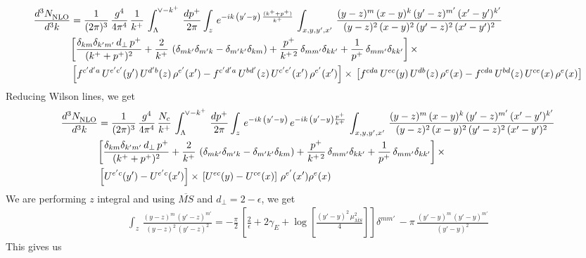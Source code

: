 \begin{align}
     \frac{d^{3}N_{\rm NLO}^{\rm}}{d^{3}k}  & = \frac{1}{(2\pi)^{3}}\,\frac{g^{4}}{4\pi^{4}}\,\frac{1}{k^{+}}\,\int_{\Lambda}^{\vee-k^{+}}\, \frac{dp^{+}}{2\pi}\int_{z}\,e^{-ik\,\left(y'-y\right)\, \frac{(k^{+}+p^{+})}{k^{+}}}\,\int_{x,y,y^{\prime},x'}\,\frac{(y-z)^{m}\,(x-y)^{k}\,(y'-z)^{m'}\,(x'-y')^{k'}}{(y-z)^{2}\,(x-y)^{2}\,(y'-z)^{2}\,(x'-y')^{2}}\notag \\ &  \bigg[\frac{\delta_{km}\delta_{k'm'}\,d_{\perp}\,p^{+}}{(k^{+}+p^{+})^{2}}+\frac{2}{k^{+}}\,\left(\delta_{mk'}\delta_{m'k}-\delta_{m'k'}\delta_{km}\right) + \frac{p^{+}}{k^{+\,2}}\,\delta_{mm'}\delta_{kk'}+\frac{1}{p^{+}}\,\delta_{mm'}\delta_{kk'}\bigg]\,\times\,\notag \\ & \left[f^{c'd'a}\,U^{e'c'}(y')\,U^{d'b}(z)\,\rho^{e'}(x')-f^{c'd'a}\, 
    U^{bd'}(z)\,U^{c'e'}(x')\,\rho^{e'}(x')\right]\times\, \left[f^{cda}\,U^{ec}(y)\,U^{db}(z)\,\rho^{e}(x)-f^{cda}\, 
    U^{bd}(z)\,U^{ce}(x)\,\rho^{e}(x)\right]
\end{align}
Reducing Wilson lines, we get
\begin{align}
     \frac{d^{3}N_{\rm NLO}^{\rm}}{d^{3}k}  & = \frac{1}{(2\pi)^{3}}\,\frac{g^{4}}{4\pi^{4}}\,\frac{N_{c}}{k^{+}}\,\int_{\Lambda}^{\vee-k^{+}}\, \frac{dp^{+}}{2\pi}\int_{z}\,e^{-ik\,\left(y'-y\right)}\,e^{-ik\,\left(y'-y\right)\frac{p^{+}}{k^{+}}}\,\int_{x,y,y^{\prime},x'}\,\frac{(y-z)^{m}\,(x-y)^{k}\,(y'-z)^{m'}\,(x'-y')^{k'}}{(y-z)^{2}\,(x-y)^{2}\,(y'-z)^{2}\,(x'-y')^{2}}\notag \\ &  \bigg[\frac{\delta_{km}\delta_{k'm'}\,d_{\perp}\,p^{+}}{(k^{+}+p^{+})^{2}}+\frac{2}{k^{+}}\,\left(\delta_{mk'}\delta_{m'k}-\delta_{m'k'}\delta_{km}\right) + \frac{p^{+}}{k^{+\,2}}\,\delta_{mm'}\delta_{kk'}+\frac{1}{p^{+}}\,\delta_{mm'}\delta_{kk'}\bigg]\,\times\,\notag \\ & \left[U^{e'c}(y') - U^{e'c}(x')\right] \times\, \left[U^{ec}(y) - U^{ce}(x)\right]\, \rho^{e'}(x') \rho^{e}(x)
\end{align}
We are performing $z$ integral and using $\overline{MS}$ and $d_{\perp} = 2-\epsilon$, we get
\begin{align}
    \int_{z}\, \frac{(y-z)^{m}\,(y'-z)^{m'}}{(y-z)^{2}\,(y'-z)^{2}} = -\frac{\pi}{2}\, \left[\frac{2}{\epsilon} +2\gamma_{E} + \log{\left[\frac{(y'-y)^{2}\,\mu^{2}_{\overline{MS}}}{4}\right]}\right]\delta^{mm'}\, - \pi\, \frac{(y'-y)^{m}\,(y'-y)^{m'}}{(y'-y)^{2}}
\end{align}
This gives us
